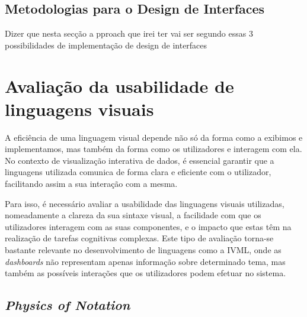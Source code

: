 
\subsection{Metodologias para o Design de Interfaces} %
\label{sub:metodologias}

Dizer que nesta secção a pproach que irei ter vai ser segundo essas 3 possibilidades de implementação de design de interfaces


\section{Avaliação da usabilidade de linguagens visuais} %
\label{sec:avaliacao_usabilidade}

A eficiência de uma linguagem visual depende não só da forma como a exibimos e implementamos, mas também da forma como os utilizadores e interagem com ela. No contexto de visualização interativa de dados, é essencial garantir que a linguagens utilizada comunica de forma clara e eficiente com o utilizador, facilitando assim a sua interação com a mesma. 

Para isso, é necessário avaliar a usabilidade das linguagens visuais utilizadas, nomeadamente a clareza da sua sintaxe visual, a facilidade com que os utilizadores interagem com as suas componentes, e o impacto que estas têm na realização de tarefas cognitivas complexas. Este tipo de avaliação torna-se bastante relevante no desenvolvimento de linguagens como a \gls{IVML}, onde as \textit{dashboards} não representam apenas informação sobre determinado tema, mas também as possíveis interações que os utilizadores podem efetuar no sistema.

\subsection{\textit{Physics of Notation}} %
\label{sub:physics_notation}


